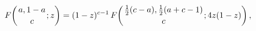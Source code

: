 \[\mathop{F\/}\nolimits\!\left({a,1-a\atop c};z\right)=(1-z)^{c-1}\mathop{F\/}%
\nolimits\!\left({\frac{1}{2}(c-a),\frac{1}{2}(a+c-1)\atop c};4z(1-z)\right),\]